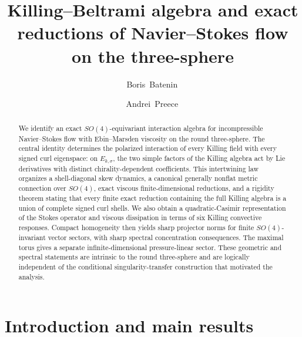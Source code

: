 \documentclass[
 aps,
 prd,
 reprint,
 amsmath,
 amssymb,
 nofootinbib,
 superscriptaddress
]{revtex4-2}
\theoremstyle{definition}
\theoremstyle{remark}
\begin{document}
\title{Killing--Beltrami algebra and exact reductions of Navier--Stokes flow on the three-sphere}

\author{Boris~Batenin\,}

\author{Andrei~Preece\,}


\begin{abstract}
We identify an exact $SO(4)$-equivariant interaction algebra for incompressible
Navier--Stokes flow with Ebin--Marsden viscosity on the round three-sphere.
The central identity determines the polarized interaction of every Killing
field with every signed curl eigenspace: on $E_{k,\sigma}$, the two simple
factors of the Killing algebra act by Lie derivatives with distinct
chirality-dependent coefficients. This intertwining law organizes a
shell-diagonal skew dynamics, a canonical generally nonflat metric connection
over $SO(4)$, exact viscous finite-dimensional reductions, and a rigidity
theorem stating that every finite exact reduction containing the full Killing
algebra is a union of complete signed curl shells. We also obtain a
quadratic-Casimir representation of the Stokes operator and viscous
dissipation in terms of six Killing convective responses. Compact homogeneity
then yields sharp projector norms for finite $SO(4)$-invariant vector sectors,
with sharp spectral concentration consequences. The maximal
torus gives a separate infinite-dimensional pressure-linear sector. These
geometric and spectral statements are intrinsic to the round three-sphere and
are logically independent of the conditional singularity-transfer
construction that motivated the analysis.
\end{abstract}

\maketitle




\section{Introduction and main results}
\label{sec:intro}
\end{document}
